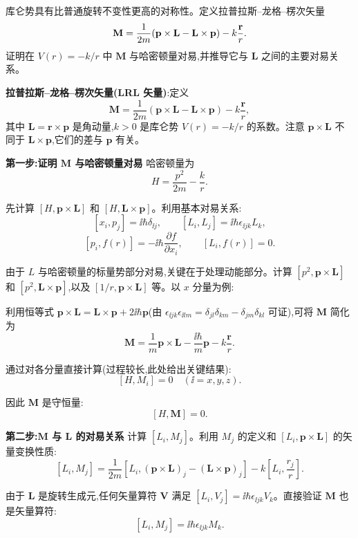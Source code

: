 \begin{question}
库仑势具有比普通旋转不变性更高的对称性。定义拉普拉斯--龙格--楞次矢量
\[
\mathbf M={1\over2m}(\mathbf p\times\mathbf L-\mathbf L\times\mathbf p)-k{\mathbf r\over r}.
\]
证明在 $V(r)=-k/r$ 中 $\mathbf M$ 与哈密顿量对易,并推导它与 $\mathbf L$ 之间的主要对易关系。
\end{question}
\begin{solution}
	\textbf{拉普拉斯--龙格--楞次矢量(LRL 矢量)}:定义
	\[
	\mathbf M = \frac{1}{2m}(\mathbf p\times\mathbf L - \mathbf L\times\mathbf p) - k\frac{\mathbf r}{r},
	\]
	其中 $\mathbf L=\mathbf r\times\mathbf p$ 是角动量,$k>0$ 是库仑势 $V(r)=-k/r$ 的系数。注意 $\mathbf p\times\mathbf L$ 不同于 $\mathbf L\times\mathbf p$,它们的差与 $\mathbf p$ 有关。

	\textbf{第一步:证明 $\mathbf M$ 与哈密顿量对易} 哈密顿量为
	\[
	H = \frac{p^2}{2m} - \frac{k}{r}.
	\]

	先计算 $[H,\mathbf p\times\mathbf L]$ 和 $[H,\mathbf L\times\mathbf p]$。利用基本对易关系:
	\[
	[x_i,p_j] = \ii\hbar\delta_{\ii j},\qquad [L_i,L_j]=\ii\hbar\epsilon_{\ii jk}L_k,
	\]
	\[
	[p_i,f(r)] = -\ii\hbar\frac{\partial f}{\partial x_i},\qquad
	[L_i,f(r)] = 0.
	\]

	由于 $L$ 与哈密顿量的标量势部分对易,关键在于处理动能部分。计算 $[p^2,\mathbf p\times\mathbf L]$ 和 $[p^2,\mathbf L\times\mathbf p]$,以及 $[1/r,\mathbf p\times\mathbf L]$ 等。以 $x$ 分量为例:

	利用恒等式 $\mathbf p\times\mathbf L = \mathbf L\times\mathbf p + 2\ii\hbar\mathbf p$(由 $\epsilon_{\ii jk}\epsilon_{\ii lm}=\delta_{jl}\delta_{km}-\delta_{jm}\delta_{kl}$ 可证),可将 $\mathbf M$ 简化为
	\[
	\mathbf M = \frac{1}{m}\mathbf p\times\mathbf L - \frac{\ii\hbar}{m}\mathbf p - k\frac{\mathbf r}{r}.
	\]

	通过对各分量直接计算(过程较长,此处给出关键结果):
	\[
	[H,M_i] = 0\quad (\ii=x,y,z).
	\]

	因此 $\mathbf M$ 是守恒量:
	\[
	\boxed{[H,\mathbf M]=0}.
	\]

	\textbf{第二步:$\mathbf M$ 与 $\mathbf L$ 的对易关系} 计算 $[L_i,M_j]$。利用 $M_j$ 的定义和 $[L_i,\mathbf p\times\mathbf L]$ 的矢量变换性质:
	\[
	[L_i,M_j] = \frac{1}{2m}[L_i,(\mathbf p\times\mathbf L)_j - (\mathbf L\times\mathbf p)_j] - k\left[L_i,\frac{r_j}{r}\right].
	\]

	由于 $\mathbf L$ 是旋转生成元,任何矢量算符 $\mathbf V$ 满足 $[L_i,V_j]=\ii\hbar\epsilon_{\ii jk}V_k$。直接验证 $\mathbf M$ 也是矢量算符:
	\[
	[L_i,M_j] = \ii\hbar\epsilon_{\ii jk}M_k.
	\]


\end{solution}
